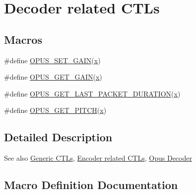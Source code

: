 \hypertarget{group__opus__decoderctls}{}\section{Decoder related C\+T\+Ls}
\label{group__opus__decoderctls}
\subsection*{Macros}
\begin{DoxyCompactItemize}
\item 
\#define \hyperlink{group__opus__decoderctls_ga8ddb6fa694efa2c7e95ef51addc70dac}{O\+P\+U\+S\+\_\+\+S\+E\+T\+\_\+\+G\+A\+IN}(\hyperlink{fmaths_8inl_a7ba8ab2f1e8f362163e17da3f15a5db9}{x})
\item 
\#define \hyperlink{group__opus__decoderctls_ga00ca8b4bd753a837f143ebd8ed63d247}{O\+P\+U\+S\+\_\+\+G\+E\+T\+\_\+\+G\+A\+IN}(\hyperlink{fmaths_8inl_a7ba8ab2f1e8f362163e17da3f15a5db9}{x})
\item 
\#define \hyperlink{group__opus__decoderctls_ga8f3d070f56b75f2a7af54e5776b387fa}{O\+P\+U\+S\+\_\+\+G\+E\+T\+\_\+\+L\+A\+S\+T\+\_\+\+P\+A\+C\+K\+E\+T\+\_\+\+D\+U\+R\+A\+T\+I\+ON}(\hyperlink{fmaths_8inl_a7ba8ab2f1e8f362163e17da3f15a5db9}{x})
\item 
\#define \hyperlink{group__opus__decoderctls_gaa89fc25eb35fc31a02b508562dd83820}{O\+P\+U\+S\+\_\+\+G\+E\+T\+\_\+\+P\+I\+T\+CH}(\hyperlink{fmaths_8inl_a7ba8ab2f1e8f362163e17da3f15a5db9}{x})
\end{DoxyCompactItemize}


\subsection{Detailed Description}
\begin{DoxySeeAlso}{See also}
\hyperlink{group__opus__genericctls}{Generic C\+T\+Ls}, \hyperlink{group__opus__encoderctls}{Encoder related C\+T\+Ls}, \hyperlink{group__opus__decoder}{Opus Decoder} 
\end{DoxySeeAlso}


\subsection{Macro Definition Documentation}
\mbox{\label{group__opus__decoderctls_ga00ca8b4bd753a837f143ebd8ed63d247}} 
